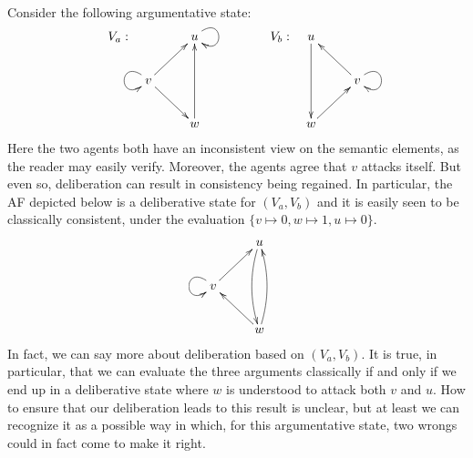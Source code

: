 \documentclass[greybox]{svmult}
\begin{document}
\begin{example}\label{ex:wr}
Consider the following argumentative state:
$$
\begin{array}{llll}
V_a: & \xymatrix{ & u \ar@(ru,rd) \\ v \ar[ur] \ar[dr] \ar@(lu,ld) \\ & w \ar[uu] } & \hspace{1.5cm} V_b: & \xymatrix{ u \ar[dd] \\ & v \ar@(ru,rd) \ar[ul] \\ w \ar[ur] }
\end{array}
$$
Here the two agents both have an inconsistent view on the semantic elements, as the reader may easily verify. Moreover, the agents agree that $v$ attacks itself. But even so, deliberation can result in consistency being regained. In particular, the AF depicted below is a deliberative state for $(V_a,V_b)$ and it is easily seen to be classically consistent, under the evaluation $\{v \mapsto 0, w \mapsto 1, u \mapsto 0\}$.
$$
\xymatrix{ & u \ar@/_/[dd] \\ v \ar@(lu,ld) \ar[ur] \\ & w \ar[ul] \ar@/_/[uu] }
$$
In fact, we can say more about deliberation based on $(V_a,V_b)$. It is true, in particular, that we can evaluate the three arguments classically if and only if we end up in a deliberative state where $w$ is understood to attack both $v$ and $u$. How to ensure that our deliberation leads to this result is unclear, but at least we can recognize it as a possible way in which, for this argumentative state, two wrongs could in fact come to make it right.

\end{example}
\end{document}
